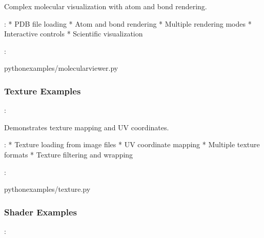 \documentclass[a4paper,10pt,english,openany,oneside]{sphinxmanual}
\begin{document}
\sphinxAtStartPar
Complex molecular visualization with atom and bond rendering.

\sphinxAtStartPar
{}:
* PDB file loading
* Atom and bond rendering
* Multiple rendering modes
* Interactive controls
* Scientific visualization

\sphinxAtStartPar
{}:

\begin{sphinxVerbatim}[commandchars=\\\{\}]
pythonexamples/molecular\PYGZus{}viewer.py
\end{sphinxVerbatim}


\subsubsection{Texture Examples}
\label{\detokenize{examples:texture-examples}}
\sphinxAtStartPar
{}: 

\sphinxAtStartPar
Demonstrates texture mapping and UV coordinates.

\sphinxAtStartPar
{}:
* Texture loading from image files
* UV coordinate mapping
* Multiple texture formats
* Texture filtering and wrapping

\sphinxAtStartPar
{}:

\begin{sphinxVerbatim}[commandchars=\\\{\}]
pythonexamples/texture.py
\end{sphinxVerbatim}


\subsubsection{Shader Examples}
\label{\detokenize{examples:shader-examples}}
\sphinxAtStartPar
{}: 
\end{document}
